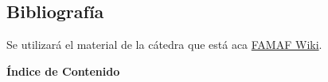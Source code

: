 \documentclass{article}
\begin{document}
\subsection*{Bibliografía}
Se utilizará el material de la cátedra que está aca \href{https://wiki.cs.famaf.unc.edu.ar/doku.php?id=algo2:main:2022}{FAMAF Wiki}.
\newpage


\thispagestyle{empty}
\begin{center}
    \huge \textbf{Índice de Contenido}
\end{center}

\noindent\makebox[\linewidth]{\rule{\textwidth}{0.4pt}}

\startcontents
{}
\newpage








\end{document}
